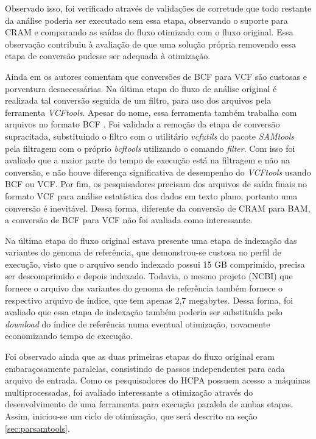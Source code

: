 \documentclass[cic,tc]{iiufrgs}
\begin{document}
Observado isso, foi verificado através de validações de corretude que todo
restante da análise poderia ser executado sem essa etapa, observando o suporte
para CRAM e comparando as saídas do fluxo otimizado com o fluxo original. Essa
observação contribuiu à avaliação de que uma solução própria removendo essa
etapa de conversão pudesse ser adequada à otimização.

Ainda em \cite{danecek2021twelve} os autores comentam que conversões de BCF
para VCF são custosas e porventura desnecessárias. Na última etapa do fluxo de
análise original é realizada tal conversão seguida de um filtro, para uso dos
arquivos pela ferramenta \textit{VCFtools}. Apesar do nome, essa ferramenta também
trabalha com arquivos no formato BCF \cite{man2015vcftools}. Foi validada a
remoção da etapa de conversão supracitada, substituindo o filtro com o
utilitário \textit{vcfutils} do pacote \textit{SAMtools} pela filtragem com o próprio
\textit{bcftools} utilizando o comando \textit{filter}. Com isso foi avaliado que a
maior parte do tempo de execução está na filtragem e não na conversão, e não
houve diferença significativa de desempenho do \textit{VCFtools} usando BCF ou VCF. Por
fim, os pesquisadores precisam dos arquivos de saída finais no formato VCF para
análise estatística dos dados em texto plano, portanto uma conversão é
inevitável. Dessa forma, diferente da conversão de CRAM para BAM, a conversão
de BCF para VCF não foi avaliada como interessante.

Na última etapa do fluxo original estava presente uma etapa de indexação das
variantes do genoma de referência, que demonstrou-se custosa no perfil de
execução, visto que o arquivo sendo indexado possui 15 GB comprimido, precisa
ser descomprimido e depois indexado. Todavia, o mesmo projeto (NCBI) que
fornece o arquivo das variantes do genoma de referência também fornece o
respectivo arquivo de índice, que tem apenas 2,7 megabytes. Dessa forma, foi
avaliado que essa etapa de indexação também poderia ser substituída pelo
\textit{download} do índice de referência numa eventual otimização, novamente
economizando tempo de execução.

Foi observado ainda que as duas primeiras etapas do fluxo original eram
embaraçosamente paralelas, consistindo de passos independentes para cada
arquivo de entrada. Como os pesquisadores do HCPA possuem acesso a máquinas
multiprocessadas, foi avaliado interessante a otimização através do
desenvolvimento de uma ferramenta para execução paralela de ambas etapas.
Assim, iniciou-se um ciclo de otimização, que será descrito na seção
\ref{sec:parsamtools}.
\end{document}
